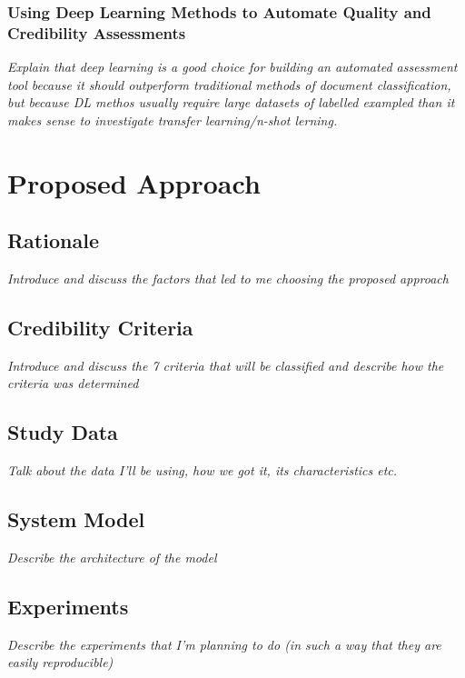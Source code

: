 \documentclass[a4paper,twoside,phd]{BYUPhys}
\begin{document}
\subsection{Using Deep Learning Methods to Automate Quality and Credibility Assessments}
\label{sec:DLForAutommation}
\textit{Explain that deep learning is a good choice for building an automated assessment tool because it should outperform traditional methods of document classification, but because DL methos usually require large datasets of labelled exampled than it makes sense to investigate transfer learning/n-shot lerning.}



\chapter{Proposed Approach}
\label{chap:approach}

\section{Rationale}
\label{sec:ProposedRationale}
\textit{Introduce and discuss the factors that led to me choosing the proposed approach}


\section{Credibility Criteria}
\label{sect:CredibilityCriteria}
\textit{Introduce and discuss the 7 criteria that will be classified and describe how the criteria was determined}

\section{Study Data}
\label{sec:StudyData}
\textit{Talk about the data I'll be using, how we got it, its characteristics etc.}

\section{System Model}
\label{sect:chap2sysmodel}
\textit{Describe the architecture of the model}

\section{Experiments}
\label{sec:Experiments}
\textit{Describe the experiments that I'm planning to do (in such a way that they are easily reproducible)}
\end{document}
